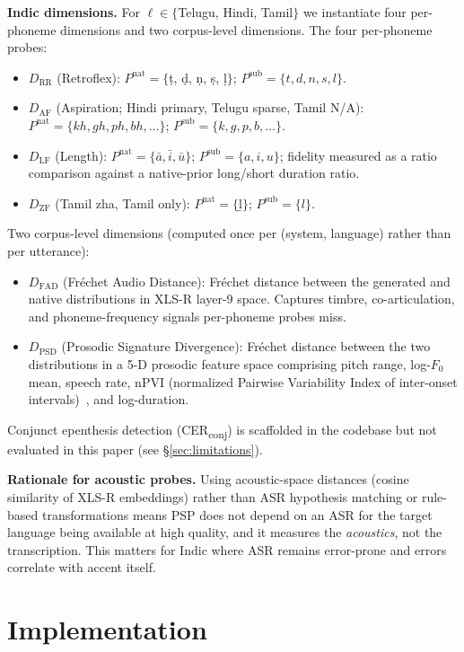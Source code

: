 \documentclass[conference,a4paper]{IEEEtran}
\newcommand{\psp}{\textsc{PSP}}
\begin{document}
\textbf{Indic dimensions.} For $\ell \in \{$Telugu, Hindi, Tamil$\}$ we instantiate four per-phoneme dimensions and two corpus-level dimensions. The four per-phoneme probes:
\begin{itemize}
  \item $D_{\text{RR}}$ (Retroflex): $P^{\text{nat}} = \{$\d{t}, \d{d}, \d{n}, \d{s}, \d{l}$\}$; $P^{\text{sub}} = \{t, d, n, s, l\}$.
  \item $D_{\text{AF}}$ (Aspiration; Hindi primary, Telugu sparse, Tamil N/A): $P^{\text{nat}} = \{kh, gh, ph, bh, \dots\}$; $P^{\text{sub}} = \{k, g, p, b, \dots\}$.
  \item $D_{\text{LF}}$ (Length): $P^{\text{nat}} = \{\bar{a}, \bar{i}, \bar{u}\}$; $P^{\text{sub}} = \{a, i, u\}$; fidelity measured as a ratio comparison against a native-prior long/short duration ratio.
  \item $D_{\text{ZF}}$ (Tamil zha, Tamil only): $P^{\text{nat}} = \{$\b{l}$\}$; $P^{\text{sub}} = \{l\}$.
\end{itemize}
Two corpus-level dimensions (computed once per (system, language) rather than per utterance):
\begin{itemize}
  \item $D_{\text{FAD}}$ (Fr\'echet Audio Distance): Fr\'echet distance between the generated and native distributions in XLS-R layer-9 space. Captures timbre, co-articulation, and phoneme-frequency signals per-phoneme probes miss.
  \item $D_{\text{PSD}}$ (Prosodic Signature Divergence): Fr\'echet distance between the two distributions in a 5-D prosodic feature space comprising pitch range, log-$F_0$ mean, speech rate, nPVI (normalized Pairwise Variability Index of inter-onset intervals)~\cite{grabe2002durational}, and log-duration.
\end{itemize}
Conjunct epenthesis detection (CER\textsubscript{conj}) is scaffolded in the codebase but not evaluated in this paper (see §\ref{sec:limitations}).

\textbf{Rationale for acoustic probes.} Using acoustic-space distances (cosine similarity of XLS-R embeddings) rather than ASR hypothesis matching or rule-based transformations means \psp{} does not depend on an ASR for the target language being available at high quality, and it measures the \emph{acoustics}, not the transcription. This matters for Indic where ASR remains error-prone and errors correlate with accent itself.

\section{Implementation}
\label{sec:impl}
\end{document}
